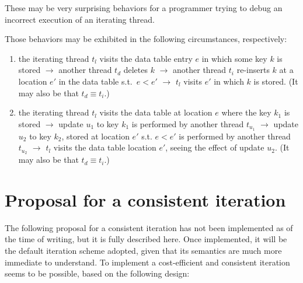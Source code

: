 These may be very surprising behaviors for a programmer trying to debug an incorrect execution of an iterating thread.

Those behaviors may be exhibited in the following circumstances, respectively:
\begin{enumerate}
    \item the iterating thread $t_l$ visits the data table entry $e$ in which some key $k$ is stored $\rightarrow$ another thread $t_d$ deletes $k$ $\rightarrow$ another thread $t_i$ re-inserts $k$ at a location $e'$ in the data table s.t.\ $e < e'$ $\rightarrow$ $t_l$ visits $e'$ in which $k$ is stored.
    (It may also be that $t_d \equiv t_i$.)
    \item the iterating thread $t_l$ visits the data table at location $e$ where the key $k_1$ is stored $\rightarrow$ update $u_1$ to key $k_1$ is performed by another thread $t_{u_1}$ $\rightarrow$ update $u_2$ to key $k_2$, stored at location $e'$ s.t. $e < e'$ is performed by another thread $t_{u_2}$ $\rightarrow$ $t_l$ visits the data table location $e'$, seeing the effect of update $u_2$.
    (It may also be that $t_d \equiv t_i$.)
\end{enumerate}


\section{Proposal for a consistent iteration}\label{sec:consistent-iteration}

The following proposal for a consistent iteration has not been implemented as of the time of writing, but it is fully described here.
Once implemented, it will be the default iteration scheme adopted, given that its semantics are much more immediate to understand.
To implement a cost-efficient and consistent iteration seems to be possible, based on the following design:


